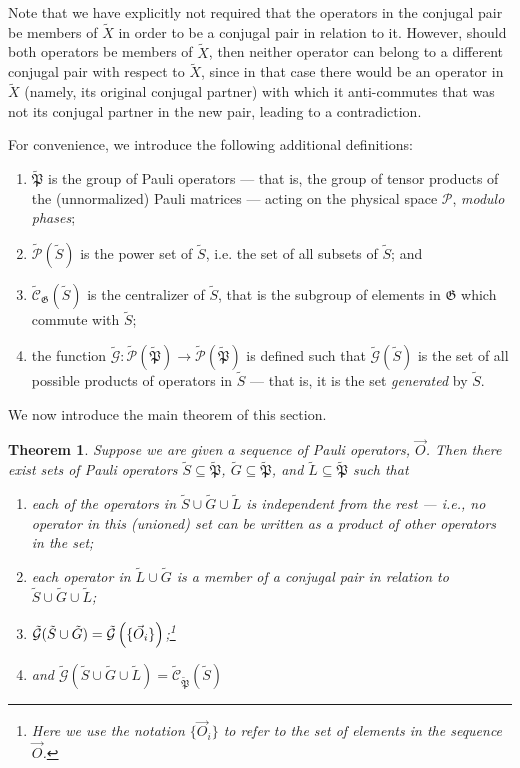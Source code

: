 \documentclass[twocolumn,showpacs,preprintnumbers,amsmath,amssymb,nofootinbib,pra,floatfix]{revtex4-1}
\newtheorem{theorem}{Theorem}
\newenvironment{definition}[1][Definition]{\begin{trivlist}
\item[\hskip \labelsep {\bfseries #1}]}{\end{trivlist}}
\newcommand{\lst}{\vec}
\newcommand{\set}{\tilde}
\newcommand{\genfun}{\tilde{\mathcal{G}}}
\newcommand{\pauligroup}{{\set{\mathfrak{P}}}}
\newcommand{\powerset}{\set{\mathcal{P}}}
\newcommand{\centralizer}{\set{\mathcal{C}}}
\begin{document}
Note that we have explicitly not required that the operators in the conjugal pair be members of $\set X$ in order to be a conjugal pair in relation to it.  However, should both operators be members of $\set X$, then neither operator can belong to a different conjugal pair with respect to $\set X$, since in that case there would be an operator in $\set X$ (namely, its original conjugal partner) with which it anti-commutes that was not its conjugal partner in the new pair, leading to a contradiction.

For convenience, we introduce the following additional definitions:

\begin{definition}

\begin{enumerate}
\item $\pauligroup$ is the group of Pauli operators --- that is, the group of tensor products of the (unnormalized) Pauli matrices --- acting on the physical space $\mathscr{P}$, \emph{modulo phases};
\item $\powerset(\set{S})$ is the power set of $\set S$, i.e. the set of all subsets of $\set S$; and
\item $\centralizer_\mathfrak{G}(\set S)$ is the centralizer of $\set S$, that is the subgroup of elements in $\mathfrak{G}$ which commute with $\set S$;
\item the function $\genfun:\powerset(\pauligroup)\to\powerset(\pauligroup)$ is defined such that $\genfun(\set S)$ is the set of all possible products of operators in $\set S$ --- that is, it is the set \emph{generated} by $\set S$.
\end{enumerate}

\end{definition}

We now introduce the main theorem of this section.

\begin{theorem} \label{theorem-SG} Suppose we are given a sequence of Pauli operators, $\lst O$.  Then there exist sets of Pauli operators $\set S\subseteq\pauligroup$, $\set G\subseteq\pauligroup$, and $\set L\subseteq\pauligroup$ such that
\begin{enumerate}
\item each of the operators in $\set S \cup \set G \cup \set L$ is independent from the rest --- i.e., no operator in this (unioned) set can be written as a product of other operators in the set;
\item each operator in $\set L \cup \set G$ is a member of a conjugal pair in relation to $\set S \cup \set G \cup \set L$;
\item $\genfun(\set S \cup \set G)=\genfun\paren{\{\lst O_i\}}$;\footnote{Here we use the notation $\{\vec{O}_i\}$ to refer to the set of elements in the sequence $\vec{O}$.}
\item and $\genfun(\set S \cup \set G \cup \set L)=\centralizer_\pauligroup(\set S )$
\end{enumerate}
\end{theorem}
\end{document}
